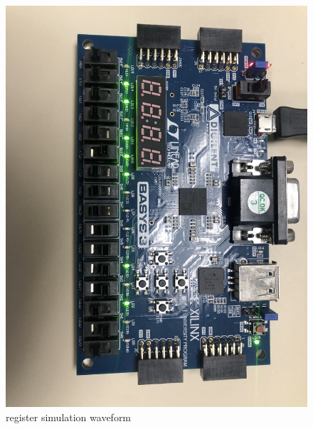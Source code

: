 \documentclass[11pt]{article}
\begin{document}
\begin{figure}[ht]\centering
	\includegraphics[width= \textwidth ]{bb7.png}
	\caption{register simulation waveform}
	\label{fig: bb7}
\end{figure}
\end{document}
